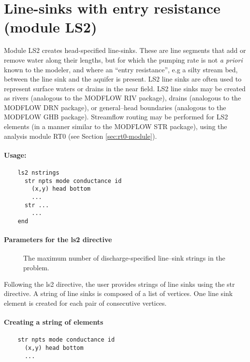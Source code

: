 \section{Line-sinks with entry resistance (module LS2)\label{sec:ls2-module}}

Module LS2 creates head-specified line-sinks. These are line segments
that add or remove water along their lengths, but for which the pumping
rate is not \emph{a priori} known to the modeler, and where an ``entry
resistance'', e.g a silty stream bed, between the line sink and the
aquifer is present. LS2 line sinks are often used to represent surface
waters or drains in the near field. LS2 line sinks may be created
as rivers (analogous to the MODFLOW RIV package), drains (analogous
to the MODFLOW DRN package), or general--head boundaries (analogous
to the MODFLOW GHB package). Streamflow routing may be performed for
LS2 elements (in a manner similar to the MODFLOW STR package), using
the analysis module RT0 (see Section \ref{sec:rt0-module}).

\paragraph{Usage:}
\begin{verbatim}
    ls2 nstrings
      str npts mode conductance id
        (x,y) head bottom
        ...
      str ...
        ...
    end
\end{verbatim}

\paragraph{Parameters for the \textsf{ls2} directive}
\begin{description}
\item [] The maximum number of discharge-specified 
   line--sink strings in the problem. \units{-}
\end{description}
Following the \textsf{ls2} directive, the user provides strings
of line sinks using the \textsf{str} directive. A string of line sinks
is composed of a list of vertices. One line sink element is created
for each pair of consecutive vertices.

\paragraph{Creating a string of elements}
\begin{verbatim}
    str npts mode conductance id
      (x,y) head bottom
      ...
\end{verbatim}

